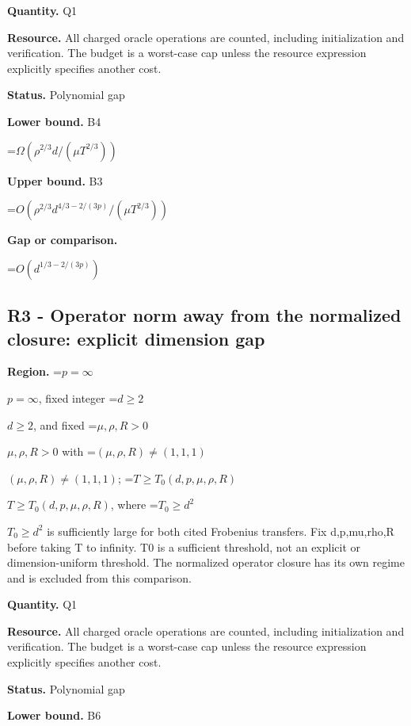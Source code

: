 \documentclass[10pt,a4paper]{article}
\newcommand{\AtlasMath}[1]{\par\begingroup\centering\setbox0=\hbox{$\displaystyle #1$}\ifdim\wd0>1.4\linewidth\typeout{ATLAS WIDE FORMULA: \the\wd0}\fi\ifdim\wd0>\linewidth\resizebox{\linewidth}{!}{\box0}\else\box0\fi\par\endgroup}
\newcommand{\AtlasInlineMath}[1]{\begingroup\setbox0=\hbox{$#1$}\ifdim\wd0>.4\linewidth\endgroup\AtlasMath{#1}\else\endgroup$#1$\fi}
\begin{document}
\textbf{Quantity.} Q1



\textbf{Resource.} All charged oracle operations are counted, including initialization and verification. The budget is a worst-case cap unless the resource expression explicitly specifies another cost.



\textbf{Status.} Polynomial gap



\textbf{Lower bound.} B4



\AtlasMath{\Omega(\rho^{2/3}d/(\mu T^{2/3}))}


\textbf{Upper bound.} B3



\AtlasMath{O(\rho^{2/3}d^{4/3-2/(3p)}/(\mu T^{2/3}))}


\textbf{Gap or comparison.}



\AtlasMath{O(d^{1/3-2/(3p)})}


\subsection{R3 - Operator norm away from the normalized closure: explicit dimension gap}


\textbf{Region.} \AtlasInlineMath{p=\infty}, fixed integer \AtlasInlineMath{d\ge2}, and fixed \AtlasInlineMath{\mu,\rho,R>0} with \AtlasInlineMath{(\mu,\rho,R)\ne(1,1,1)}; \AtlasInlineMath{T\ge T_0(d,p,\mu,\rho,R)}, where \AtlasInlineMath{T_0\ge d^2} is sufficiently large for both cited Frobenius transfers. Fix d,p,mu,rho,R before taking T to infinity. T0 is a sufficient threshold, not an explicit or dimension-uniform threshold. The normalized operator closure has its own regime and is excluded from this comparison.



\textbf{Quantity.} Q1



\textbf{Resource.} All charged oracle operations are counted, including initialization and verification. The budget is a worst-case cap unless the resource expression explicitly specifies another cost.



\textbf{Status.} Polynomial gap



\textbf{Lower bound.} B6
\end{document}
